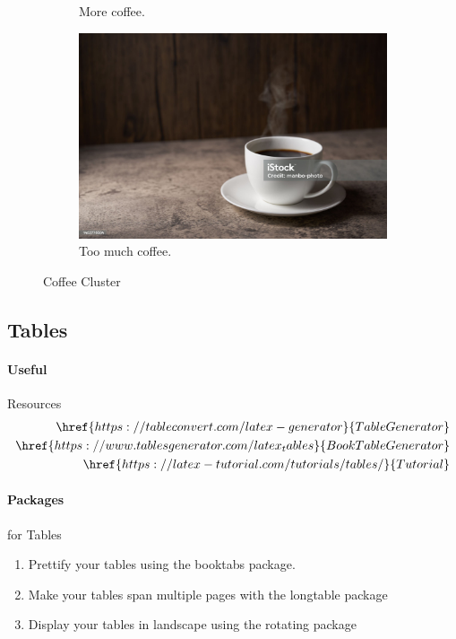 \documentclass{report}[a4paper,12pt] %
\begin{document}
\begin{figure}[h!]
\begin{subfigure}[b]{0.2\linewidth}
    \caption{More coffee.}
  \end{subfigure}
  \begin{subfigure}[b]{0.5\linewidth}
    \includegraphics[width=\linewidth]{coffee.jpg}
    \caption{Too much coffee.}
  \end{subfigure}
  \caption{Coffee Cluster}
  \label{fig:coffee3}
\end{figure}

\subsection{Tables}

\paragraph{Useful} Resources
\begin{align*}
  \href{https://tableconvert.com/latex-generator}{Table Generator}\\
  \href{https://www.tablesgenerator.com/latex_tables}{Book Table Generator}\\
  \href{https://latex-tutorial.com/tutorials/tables/}{Tutorial}
\end{align*}

\paragraph*{Packages} for Tables
\begin{enumerate}
  \item Prettify your tables using the booktabs package.
  \item Make your tables span multiple pages with the longtable package
  \item Display your tables in landscape using the rotating package  
\end{enumerate}
\end{document}
